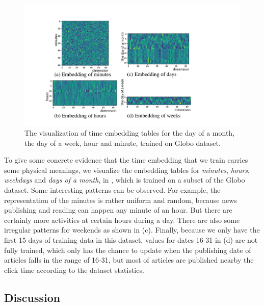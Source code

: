 \begin{figure}[th]
  \centering
  \includegraphics[width=\columnwidth]{fig/visualization.pdf}  
  \caption{The visualization of time embedding tables for the day of a month, the day of a week, hour and minute, trained on Globo dataset.}
  \label{fig:temporal}
\end{figure}

To give some concrete evidence that the time embedding that we train
carries some physical meanings, we visualize the embedding tables for
\textit{minutes}, \textit{hours}, \textit{weekdays} and \textit{days
of a month}, in , which is trained on a subset of the Globo dataset.
Some interesting patterns can be observed. For example, the representation
of the minutes is rather uniform and random, because news publishing and
reading can happen any minute of an hour. But there are certainly more
activities at certain hours during a day. There are also
some irregular patterns for weekends as shown in (c).
Finally, because we only have the first 15 days of training data in this dataset,
values for dates 16-31 in (d) are not fully trained, which only has the chance to update when the publishing date of articles falls in the range of 16-31, but most of articles are published nearby the click time according to the dataset statistics.


\subsection{Discussion}
\label{sec:discuss}


